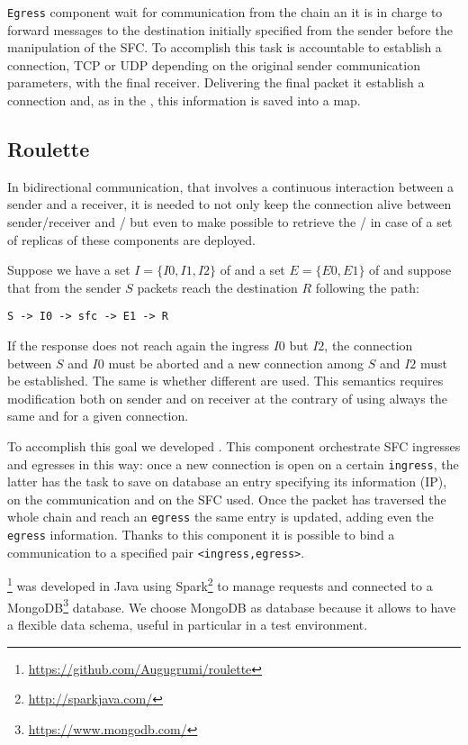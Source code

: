 \texttt{Egress} component wait for communication from the chain an it is in
charge to forward messages to the destination initially specified from the
sender before the manipulation of the SFC. To accomplish this task is
accountable to establish a connection, TCP or UDP depending on the original
sender communication parameters, with the final receiver. Delivering the final
packet it establish a connection and, as in the \ingress{}, this information is
saved into a map. 

\subsection{Roulette}
In bidirectional communication, that involves a continuous interaction between a
sender and a receiver, it is needed to not only keep the connection alive
between sender/receiver and \ingress{}/\egress{} but even to make possible to
retrieve the \ingress{}/\egress{} in case of a set of replicas of these
components are deployed.

\begin{exmp}
Suppose we have a set $I=\{I0, I1, I2\}$ of \ingresses{} and a set $E=\{E0,
E1\}$ of \egresses{} and suppose that from the sender $S$ packets reach the
destination $R$ following the path:
\begin{verbatim}
S -> I0 -> sfc -> E1 -> R
\end{verbatim}
If the response does not reach again the ingress $I0$ but $I2$, the connection
between $S$ and $I0$ must be aborted and a new connection among $S$ and $I2$
must be established. The same is whether different \egresses{} are used. This
semantics requires modification both on sender and on receiver at the
contrary of using always the same \ingress{} and \egress{} for a given
connection.
\end{exmp}

To accomplish this goal we developed \roulette{}. This component orchestrate SFC
ingresses and egresses in this way: once a new connection is open on a certain 
\texttt{ingress}, the latter has the task to save on \roulette{} database an
entry specifying its information (IP), on the communication and on the SFC used.
Once the packet has traversed the whole chain and reach an \texttt{egress} the
same entry is updated, adding even the \texttt{egress} information. Thanks to
this component it is possible to bind a communication to a specified pair 
\verb!<ingress,egress>!.

\roulette{}\footnote{\url{https://github.com/Augugrumi/roulette}} was developed
in Java using Spark\footnote{\url{http://sparkjava.com/}} to manage requests and
connected to a MongoDB\footnote{\url{https://www.mongodb.com/}} database. We
choose MongoDB as database because it allows to have a flexible data schema,
useful in particular in a test environment.

